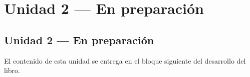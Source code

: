 %
\part{Unidad 2 --- En preparaci\'on}
\label{part:unidad2}

\chapter*{Unidad 2 --- En preparaci\'on}

El contenido de esta unidad se entrega en el bloque siguiente del desarrollo del libro.

\cleardoublepage
